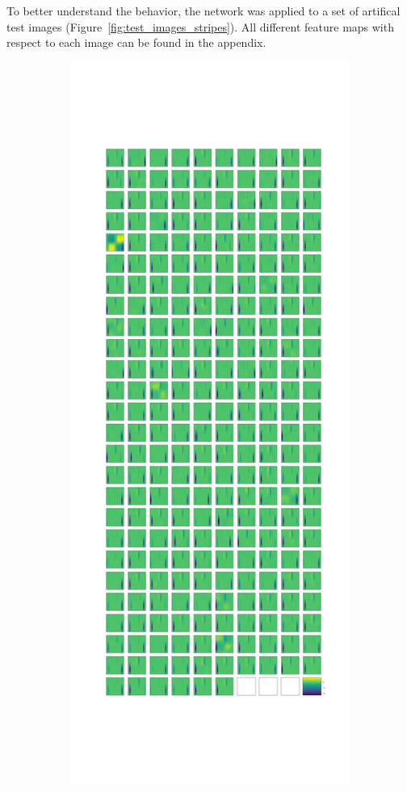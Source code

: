 \documentclass[11pt]{article}
\begin{document}
    To better understand the behavior, the network was applied to a set of artifical test images (Figure~\ref{fig:test_images_stripes}).
    All different feature maps with respect to each image can be found in the appendix.

    \begin{figure}
        \centering
        \begin{subfigure}{0.45\textwidth}
            \centering
            \includegraphics[width=\textwidth]{images/stripes/test_img_9/leaky_re_lu_5.png}

\end{subfigure}
\end{figure}
\end{document}
